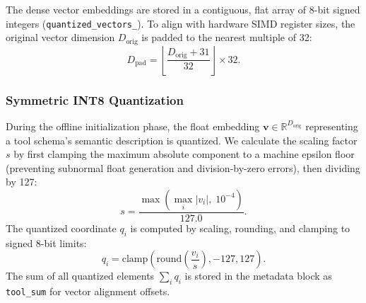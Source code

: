 \documentclass[conference,10pt]{IEEEtran}
\begin{document}
The dense vector embeddings are stored in a contiguous, flat array of 8-bit signed integers (\texttt{quantized\_vectors\_}). To align with hardware SIMD register sizes, the original vector dimension $D_{\text{orig}}$ is padded to the nearest multiple of 32:
\begin{equation}
D_{\text{pad}} = \left\lfloor \frac{D_{\text{orig}} + 31}{32} \right\rfloor \times 32.
\end{equation}

\subsubsection{Symmetric INT8 Quantization}
During the offline initialization phase, the float embedding $\mathbf{v} \in \mathbb{R}^{D_{\text{orig}}}$ representing a tool schema's semantic description is quantized. We calculate the scaling factor $s$ by first clamping the maximum absolute component to a machine epsilon floor (preventing subnormal float generation and division-by-zero errors), then dividing by 127:
\begin{equation}
s = \frac{\max\!\left(\max_i |v_i|,\; 10^{-4}\right)}{127.0}.
\end{equation}
The quantized coordinate $q_i$ is computed by scaling, rounding, and clamping to signed 8-bit limits:
\begin{equation}
q_i = \text{clamp}\left( \text{round}\left( \frac{v_i}{s} \right), -127, 127 \right).
\end{equation}
The sum of all quantized elements $\sum_{i} q_i$ is stored in the metadata block as \texttt{tool\_sum} for vector alignment offsets.
\end{document}
